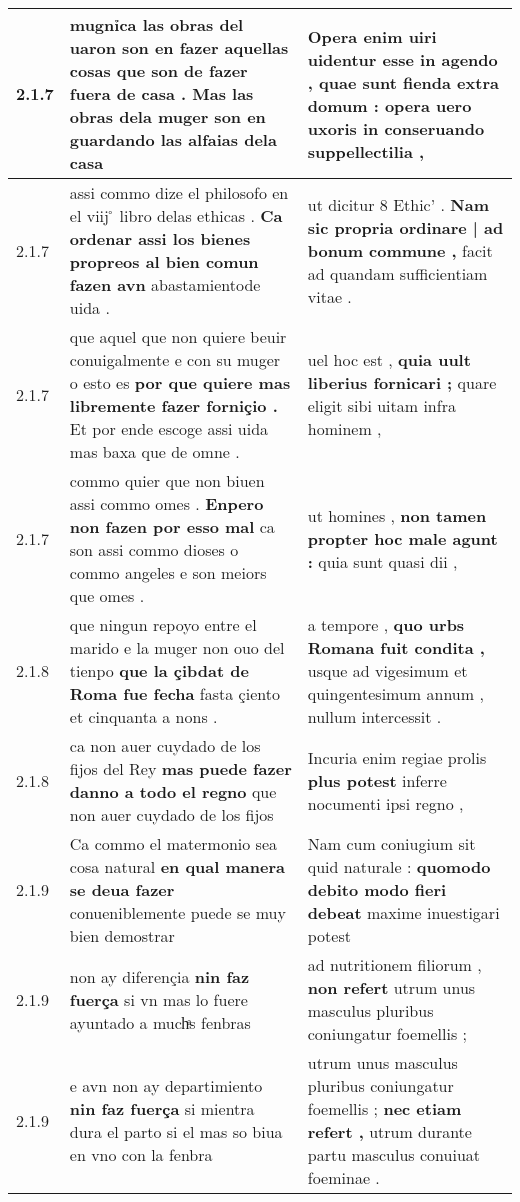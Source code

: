 \begin{tabular}{|p{1cm}|p{6.5cm}|p{6.5cm}|}
2.1.7 & mugnỉca las obras del uaron son en fazer aquellas cosas \textbf{ que son de fazer fuera de casa . } Mas las obras dela muger son en guardando las alfaias dela casa & Opera enim uiri uidentur esse in agendo , \textbf{ quae sunt fienda extra domum : } opera uero uxoris in conseruando suppellectilia , \\\hline
2.1.7 & assi commo dize el philosofo en el viij ̊ libro delas ethicas . \textbf{ Ca ordenar assi los bienes propreos al bien comun fazen avn } abastamientode uida . & ut dicitur 8 Ethic’ . \textbf{ Nam sic propria ordinare | ad bonum commune , } facit ad quandam sufficientiam vitae . \\\hline
2.1.7 & que aquel que non quiere beuir conuigalmente e con su muger o esto es \textbf{ por que quiere mas libremente fazer forniçio . } Et por ende escoge assi uida mas baxa que de omne . & uel hoc est , \textbf{ quia uult liberius fornicari ; } quare eligit sibi uitam infra hominem , \\\hline
2.1.7 & commo quier que non biuen assi commo omes . \textbf{ Enpero non fazen por esso mal } ca son assi commo dioses o commo angeles e son meiors que omes . & ut homines , \textbf{ non tamen propter hoc male agunt : } quia sunt quasi dii , \\\hline
2.1.8 & que ningun repoyo entre el marido e la muger non ouo del tienpo \textbf{ que la çibdat de Roma fue fecha } fasta çiento et cinquanta a nons . & a tempore , \textbf{ quo urbs Romana fuit condita , } usque ad vigesimum et quingentesimum annum , nullum intercessit . \\\hline
2.1.8 & ca non auer cuydado de los fijos del Rey \textbf{ mas puede fazer danno a todo el regno } que non auer cuydado de los fijos & Incuria enim regiae prolis \textbf{ plus potest } inferre nocumenti ipsi regno , \\\hline
2.1.9 & Ca commo el matermonio sea cosa natural \textbf{ en qual manera se deua fazer } conueniblemente puede se muy bien demostrar & Nam cum coniugium sit quid naturale : \textbf{ quomodo debito modo fieri debeat } maxime inuestigari potest \\\hline
2.1.9 & non ay diferençia \textbf{ nin faz fuerça } si vn mas lo fuere ayuntado a muchͣs fenbras & ad nutritionem filiorum , \textbf{ non refert } utrum unus masculus pluribus coniungatur foemellis ; \\\hline
2.1.9 & e avn non ay departimiento \textbf{ nin faz fuerça } si mientra dura el parto si el mas so biua en vno con la fenbra & utrum unus masculus pluribus coniungatur foemellis ; \textbf{ nec etiam refert , } utrum durante partu masculus conuiuat foeminae . \\\hline

\end{tabular}
